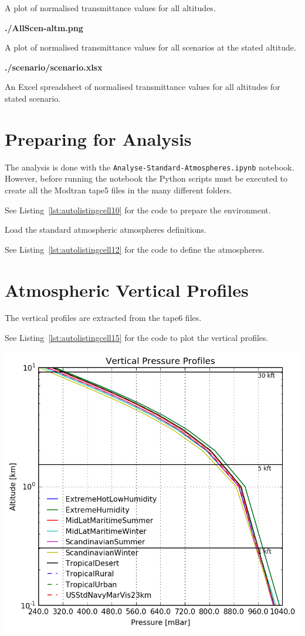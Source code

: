 \documentclass{workpackage}
\begin{document}
A plot of normalised transmittance values for all altitudes.


\textbf{./AllScen-altm.png}


A plot of normalised transmittance values for all scenarios at the stated altitude.


\textbf{./scenario/scenario.xlsx}


An Excel spreadsheet of normalised transmittance values for all altitudes for stated scenario.


\section{Preparing for Analysis}
\label{sec:PreparingforAnalysis}

The analysis is done with the  \lstinline{Analyse-Standard-Atmospheres.ipynb} notebook. 
However, before running the notebook the Python scripts must be executed to create all the Modtran tape5 files in the many different folders.

See Listing~\ref{lst:autolistingcell10} for the code to prepare the environment.

Load the standard atmospheric atmospheres definitions.




See Listing~\ref{lst:autolistingcell12} for the code to define the atmospheres.


\section{Atmospheric Vertical Profiles}
\label{sec:AtmosphericVerticalProfiles}

The vertical profiles are extracted from the tape6 files.




See Listing~\ref{lst:autolistingcell15} for the code to plot the vertical profiles.

\begin{center}
\includegraphics{./pic/Analyse-Standard-Atmospheres_15_0.png}
\end{center}
\end{document}
